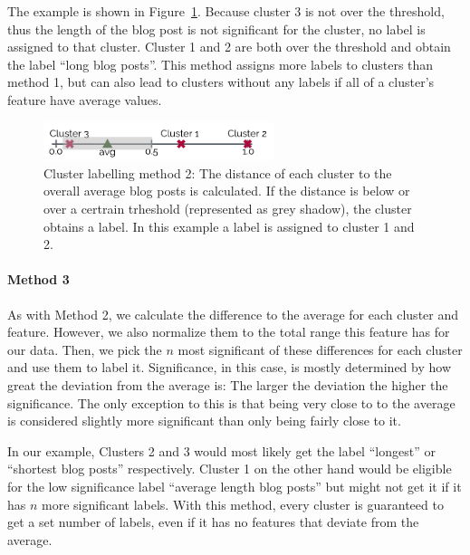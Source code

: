 The example is shown in Figure~\ref{fig:cluster_labeling_2}.
Because cluster 3 is not over the threshold, thus the length of the blog post is not significant for the cluster, no label is assigned to that cluster.
Cluster 1 and 2 are both over the threshold and obtain the label ``long blog posts''.
This method assigns more labels to clusters than method 1, but can also lead to clusters without any labels if all of a cluster's feature have average values.

\begin{figure}[ht]
	\centering
	\includegraphics[width=0.6\textwidth]{images/cluster_labeling_2.pdf}
	\caption{Cluster labelling method 2: The distance of each cluster to the overall average blog posts is calculated. If the distance is below or over a certrain trheshold (represented as grey shadow), the cluster obtains a label. In this example a label is assigned to cluster 1 and 2.}
	\label{fig:cluster_labeling_2}
\end{figure}

\paragraph{Method 3}
As with Method 2, we calculate the difference to the average for each cluster and feature.
However, we also normalize them to the total range this feature has for our data.
Then, we pick the $n$ most significant of these differences for each cluster and use them to label it.
Significance, in this case, is mostly determined by how great the deviation from the average is: The larger the deviation the higher the significance.
The only exception to this is that being very close to to the average is considered slightly more significant than only being fairly close to it.

In our example, Clusters 2 and 3 would most likely get the label ``longest'' or ``shortest blog posts'' respectively.
Cluster 1 on the other hand would be eligible for the low significance label ``average length blog posts'' but might not get it if it has $n$ more significant labels.
With this method, every cluster is guaranteed to get a set number of labels, even if it has no features that deviate from the average.
